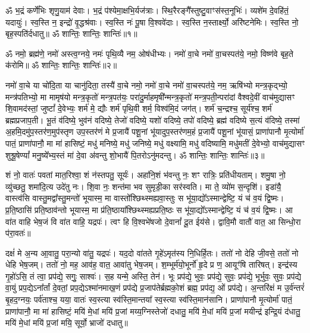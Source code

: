 


ॐ भ॒द्रं कर्णे॑भिः शृणु॒याम॑ देवाः। भ॒द्रं प॑श्येमा॒क्षभि॒र्यज॑त्राः। 
स्थि॒रैरङ्गै᳚स्तुष्टु॒वाꣳस॑स्त॒नूभिः॑। व्यशे॑म दे॒वहि॑तं॒ यदायुः॑। 
स्व॒स्ति न॒ इन्द्रो॑ वृ॒द्धश्र॑वाः। स्व॒स्ति नः॑ पू॒षा वि॒श्ववे॑दाः। 
स्व॒स्ति न॒स्तार्क्ष्यो॒ अरि॑ष्टनेमिः। स्व॒स्ति नो॒ बृह॒स्पति॑र्दधातु॥
ॐ शान्तिः॒ शान्तिः॒ शान्तिः॑॥१॥


ॐ नमो॒ ब्रह्म॑णे॒ नमो॑ अस्त्व॒ग्नये॒ नमः॑ पृथि॒व्यै नम॒ ओष॑धीभ्यः। नमो॑ वा॒चे नमो॑ वा॒चस्पत॑ये॒ नमो॒ विष्ण॑वे बृह॒ते क॑रोमि॥
ॐ शान्तिः॒ शान्तिः॒ शान्तिः॑॥२॥


नमो॑ वा॒चे या चो॑दि॒ता या चानु॑दिता॒ तस्यै॑ वा॒चे नमो॒ नमो॑ वा॒चे नमो॑ वा॒चस्पत॑ये॒ नम॒ ऋषि॑भ्यो मन्त्र॒कृद्भ्यो॒ मन्त्र॑पतिभ्यो॒ मा मामृष॑यो मन्त्र॒कृतो॑ मन्त्र॒पत॑यः॒ परा॑दु॒र्माहमृषी᳚न्मन्त्र॒कृतो॑ मन्त्र॒पती॒न्परा॑दां वैश्वदे॒वीं वाच॑मुद्यासꣳ शि॒वामद॑स्तां॒ जुष्टां᳚ दे॒वेभ्यः॒ शर्म॑ मे॒ द्यौः  शर्म॑ पृथि॒वी शर्म॒ विश्व॑मि॒दं जग॑त्। शर्म॑ च॒न्द्रश्च॒ सूर्य॑श्च॒ शर्म॑ ब्रह्मप्रजाप॒ती। भू॒तं व॑दिष्ये॒ भुव॑नं वदिष्ये॒ तेजो॑ वदिष्ये॒ यशो॑ वदिष्ये॒ तपो॑ वदिष्ये॒ ब्रह्म॑ वदिष्ये स॒त्यं व॑दिष्ये॒ तस्मा॑ अ॒हमि॒दमु॑प॒स्तर॑ण॒मुप॑स्तृण उप॒स्तर॑णं मे प्र॒जायै॑ पशू॒नां भू॑यादुप॒स्तर॑णम॒हं प्र॒जायै॑ पशू॒नां भू॑यासं॒ प्राणा॑पानौ मृ॒त्योर्मा॑ पातं॒ प्राणा॑पानौ॒ मा मा॑ हासिष्टं॒ मधु॑ मनिष्ये॒ मधु॑ जनिष्ये॒ मधु॑ वक्ष्यामि॒ मधु॑ वदिष्यामि॒ मधु॑मतीं दे॒वेभ्यो॒ वाच॑मुद्यासꣳ शुश्रू॒षेण्यां᳚ मनु॒ष्ये᳚भ्य॒स्तं मा॑ दे॒वा अ॑वन्तु शो॒भायै॑ पि॒तरोऽनु॑मदन्तु। ॐ शान्तिः॒ शान्तिः॒ शान्तिः॑॥३॥

शं नो॒ वातः॑ पवतां मात॒रिश्वा॒ शं न॑स्तपतु॒ सूर्यः॑। अहा॑नि॒शं भ॑वन्तु नः॒ शꣳ रात्रिः॒ प्रति॑धीयताम्। शमु॒षा नो॒ व्यु॑च्छतु॒ शमा॑दि॒त्य उदे॑तु नः। शि॒वा नः॒ शन्त॑मा भव सुमृडी॒का सर॑स्वति। मा ते॒ व्यो॑म स॒न्दृशि॑। इडा॑यै॒ वास्त्व॑सि वास्तु॒मद्वा᳚स्तु॒मन्तो॑ भूयास्म॒ मा वास्तो᳚श्छिथ्स्मह्यवा॒स्तुः स भू॑या॒द्यो᳚ऽस्मान्द्वेष्टि॒ यं च॑ व॒यं द्वि॒ष्मः। प्र॒ति॒ष्ठासि॑ प्रति॒ष्ठाव॑न्तो भूयास्म॒ मा प्र॑ति॒ष्ठाया᳚श्छिथ्स्मह्यप्रति॒ष्ठः स भू॑या॒द्यो᳚ऽस्मान्द्वेष्टि॒ यं च॑ व॒यं द्वि॒ष्मः। आ वा॑त वाहि भेष॒जं वि वा॑त वाहि॒ यद्रपः॑। त्वꣳ हि वि॒श्वभे॑षजो दे॒वानां᳚ दू॒त ईय॑से। द्वावि॒मौ वातौ॑ वात॒ आ सिन्धो॒रा प॑रा॒वतः॑॥

दक्षं॑ मे अ॒न्य आ॒वातु॒ परा॒न्यो वा॑तु॒ यद्रपः॑। यद॒दो वा॑तते गृ॒हे॑ऽमृत॑स्य नि॒धिर्\mbox{}हि॒तः। ततो॑ नो देहि जी॒वसे॒ ततो॑ नो धेहि भेष॒जम्। ततो॑ नो॒ मह॒ आव॑ह॒ वात॒ आवा॑तु भेष॒जम्। श॒म्भूर्म॑यो॒भूर्नो॑ हृ॒दे प्र ण॒ आयूꣳ॑षि तारिषत्। इन्द्र॑स्य गृ॒हो॑ऽसि॒ तं त्वा॒ प्रप॑द्ये॒ सगुः॒ साश्वः॑। स॒ह यन्मे॒ अस्ति॒ तेन॑। भूः प्रप॑द्ये॒ भुवः॒ प्रप॑द्ये॒ सुवः॒ प्रप॑द्ये॒ भूर्भुवः॒ सुवः॒ प्रप॑द्ये वा॒युं प्रप॒द्येऽना᳚र्तां दे॒वतां॒ प्रप॒द्येऽश्मा॑नमाख॒णं प्रप॑द्ये प्र॒जाप॑तेर्ब्रह्मको॒शं ब्रह्म॒ प्रप॑द्य॒ ओं प्रप॑द्ये। अ॒न्तरि॑क्षं म उ॒र्व॑न्तरं॑ बृ॒हद॒ग्नयः॒ पर्व॑ताश्च॒ यया॒ वातः॑ स्व॒स्त्या स्व॑स्ति॒मान्तया᳚ स्व॒स्त्या स्व॑स्ति॒मान॑सानि। प्राणा॑पानौ मृ॒त्योर्मा॑ पातं॒ प्राणा॑पानौ॒ मा मा॑ हासिष्टं॒ मयि॑ मे॒धां मयि॑ प्र॒जां मय्य॒ग्निस्तेजो॑ दधातु॒ मयि॑ मे॒धां मयि॑ प्र॒जां मयीन्द्र॑ इन्द्रि॒यं द॑धातु॒ मयि॑ मे॒धां मयि॑ प्र॒जां मयि॒ सूर्यो॒ भ्राजो॑ दधातु॥

